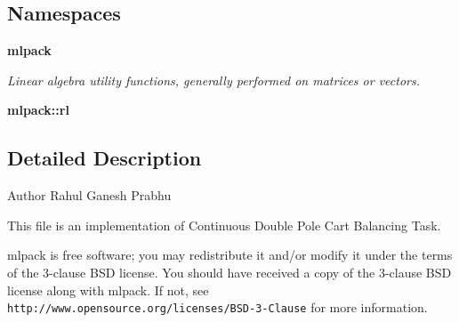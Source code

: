 \subsection*{Namespaces}
\begin{DoxyCompactItemize}
\item 
 \textbf{ mlpack}
\begin{DoxyCompactList}\small\item\em Linear algebra utility functions, generally performed on matrices or vectors. \end{DoxyCompactList}\item 
 \textbf{ mlpack\+::rl}
\end{DoxyCompactItemize}


\subsection{Detailed Description}
\begin{DoxyAuthor}{Author}
Rahul Ganesh Prabhu
\end{DoxyAuthor}
This file is an implementation of Continuous Double Pole Cart Balancing Task.

mlpack is free software; you may redistribute it and/or modify it under the terms of the 3-\/clause B\+SD license. You should have received a copy of the 3-\/clause B\+SD license along with mlpack. If not, see {\tt http\+://www.\+opensource.\+org/licenses/\+B\+S\+D-\/3-\/\+Clause} for more information. 